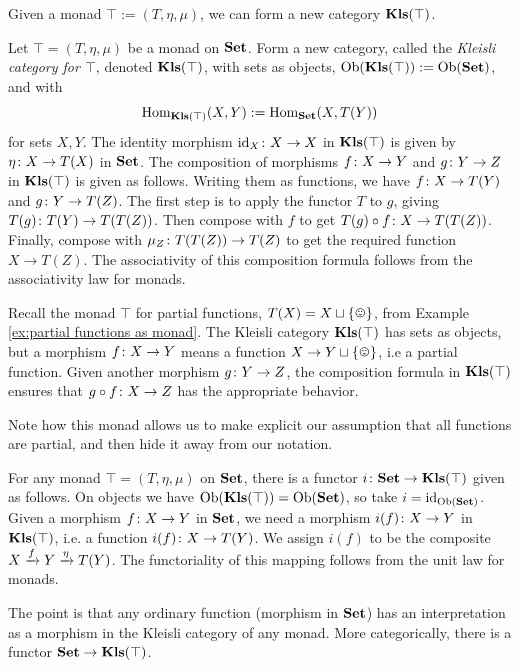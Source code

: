 Given a monad $\top:=(T,\eta,\mu)$, we can form a new category ${\bf Kls}(\top)$.

\begin{definition}\label{def:kleisli}

Let $\top=(T,\eta,\mu)$ be a monad on ${\bf Set}$. Form a new category, called the {\em Kleisli category for $\top$}, denoted ${\bf Kls}(\top)$, with sets as objects, $\textnormal{Ob}({\bf Kls}(\top)):=\textnormal{Ob}({\bf Set})$, and with $$\textnormal{Hom}_{{\bf Kls}(\top)}(X,Y):=\textnormal{Hom}_{\bf Set}(X,T(Y))$$ for sets $X,Y$. The identity morphism $\textnormal{id}_X\colon X\rightarrow X$ in ${\bf Kls}(\top)$ is given by $\eta\colon X\rightarrow T(X)$ in ${\bf Set}$. The composition of morphisms $f\colon X\rightarrow Y$ and $g\colon Y\rightarrow Z$ in ${\bf Kls}(\top)$ is given as follows. Writing them as functions, we have $f\colon X\rightarrow T(Y)$ and $g\colon Y\rightarrow T(Z)$. The first step is to apply the functor $T$ to $g$, giving $T(g)\colon T(Y)\rightarrow T(T(Z))$. Then compose with $f$ to get $T(g)\circ f\colon X\rightarrow T(T(Z))$. Finally, compose with $\mu_Z\colon T(T(Z))\rightarrow T(Z)$ to get the required function $X\to T(Z)$. The associativity of this composition formula follows from the associativity law for monads.

\end{definition}

\begin{example}

Recall the monad $\top$ for partial functions, $T(X)=X\sqcup\singleton$, from Example \ref{ex:partial functions as monad}. The Kleisli category ${\bf Kls}(\top)$ has sets as objects, but a morphism $f\colon X\rightarrow Y$ means a function $X\to Y\sqcup\singleton$, i.e a partial function. Given another morphism $g\colon Y\rightarrow Z$, the composition formula in ${\bf Kls}(\top)$ ensures that $g\circ f\colon X\rightarrow Z$ has the appropriate behavior.

Note how this monad allows us to make explicit our assumption that all functions are partial, and then hide it away from our notation.

\end{example}

\begin{remark}\label{rem:ordinary are kleisli}

For any monad $\top=(T,\eta,\mu)$ on ${\bf Set}$, there is a functor $i\colon {\bf Set}\rightarrow{\bf Kls}(\top)$ given as follows. On objects we have $\textnormal{Ob}({\bf Kls}(\top))=\textnormal{Ob}({\bf Set})$, so take $i=\textnormal{id}_{\textnormal{Ob}({\bf Set})}$. Given a morphism $f\colon X\rightarrow Y$ in ${\bf Set}$, we need a morphism $i(f)\colon X\rightarrow Y$ in ${\bf Kls}(\top)$, i.e. a function $i(f)\colon X\rightarrow T(Y)$. We assign $i(f)$ to be the composite $X\xrightarrow{f}Y\xrightarrow{\eta}T(Y)$. The functoriality of this mapping follows from the unit law for monads.

The point is that any ordinary function (morphism in ${\bf Set}$) has an interpretation as a morphism in the Kleisli category of any monad. More categorically, there is a functor ${\bf Set}\rightarrow{\bf Kls}(\top)$.

\end{remark}

